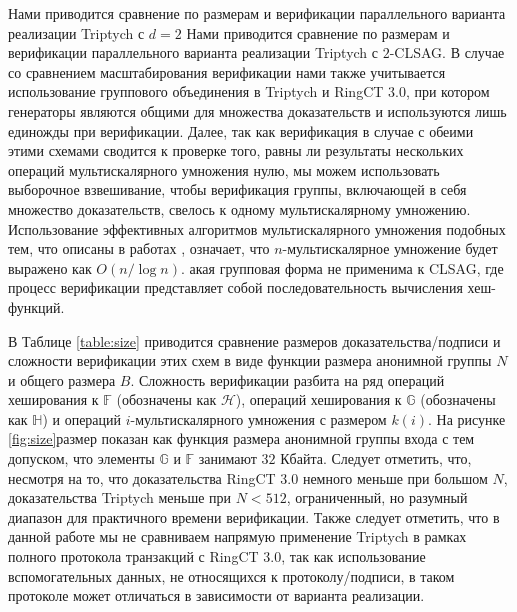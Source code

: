 \documentclass{article}
\newcommand{\F}{\mathbb{F}}
\newcommand{\hs}{\mathcal{H}}
\newcommand{\hp}{\mathbb{H}}
\theoremstyle{definition}
\begin{document}
Нами приводится сравнение по размерам и верификации параллельного варианта реализации \linebreak Triptych с $d = 2$ Нами приводится сравнение по размерам и верификации параллельного варианта реализации Triptych с $2$-CLSAG.
В случае со сравнением масштабирования верификации нами также учитывается использование группового объединения в Triptych и RingCT 3.0, при котором генераторы являются общими для множества доказательств и используются лишь единожды при верификации.
Далее, так как верификация в случае с обеими этими схемами сводится к проверке того, равны ли результаты нескольких операций мультискалярного умножения нулю, мы можем использовать выборочное взвешивание, чтобы верификация группы, включающей в себя множество доказательств, свелось к одному мультискалярному умножению.
Использование эффективных алгоритмов мультискалярного умножения подобных тем, что описаны в работах \cite{straus,pippenger}, означает, что $n$-мультискалярное умножение будет выражено как $O(n/\log n)$.
акая групповая форма не применима к CLSAG, где процесс верификации представляет собой последовательность вычисления хеш-функций.

В Таблице \ref{table:size} приводится сравнение размеров доказательства/подписи и сложности верификации этих схем в виде функции размера анонимной группы $N$ и общего размера $B$.
Сложность верификации разбита на ряд операций хеширования к $\F$ (обозначены как $\hs$), операций хеширования к \begin{math}\mathbb{G}\end{math} (обозначены как $\hp$) и операций $i$-мультискалярного умножения с размером $k(i)$.
На рисунке \ref{fig:size}размер показан как функция размера анонимной группы входа с тем допуском, что элементы \begin{math}\mathbb{G}\end{math} и $\F$ занимают $32$ Кбайта.
Следует отметить, что, несмотря на то, что доказательства RingCT 3.0 немного меньше при большом $N$, доказательства Triptych меньше при $N < 512$, ограниченный, но разумный диапазон для практичного времени верификации.
Также следует отметить, что в данной работе мы не сравниваем напрямую применение Triptych в рамках полного протокола транзакций с RingCT 3.0, так как использование вспомогательных данных, не относящихся к протоколу/подписи, в таком протоколе может отличаться в зависимости от варианта реализации.
\end{document}
